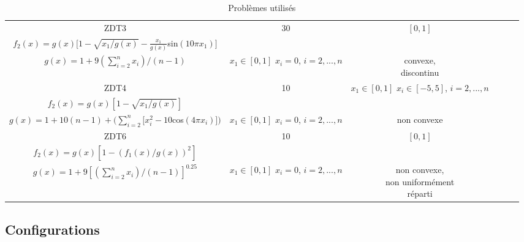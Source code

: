 \documentclass[12pt, letterpaper]{article}
\newcommand{\fncell}[3][]{\makecell[l]{#1 \\ #2 \\ #3}}
\begin{document}
\begin{table}[ht]
\begin{adjustbox}{width=1\textwidth}
\begin{tabular}{|c|c|c|c|c|c|}
      \hline
      ZDT3 & 30 & $[0, 1]$ & \fncell[$f_1(x) = x_1$]
                             {$f_2(x) = g(x) [1 - \sqrt{x_1 / g(x)} - \frac{x_1}{g(x)}$sin$(10\pi{}x_1)]$}
                             {$g(x) = 1 + 9(\sum_{i = 2}^{n} x_i) / (n - 1)$}
                                                                   & \makecell{$x_1 \in{} [0, 1]$ \\ $x_i = 0$, \\ $i = 2, ..., n$} & \makecell{convexe, \\ discontinu}\\
      \hline
      ZDT4 & 10 & \makecell{$x_1 \in{} [0, 1]$ \\ $x_i \in{} [-5, 5]$, \\ $i = 2, ..., n$}
               & \fncell[$f_1(x) = x_1$]
                 {$f_2(x) = g(x) [1 - \sqrt{x_1 / g(x)}]$}
                 {$g(x) = 1 + 10(n - 1) + (\sum_{i = 2}^{n} [x_i^2 - 10$cos$(4\pi{}x_i)])$}
                     & \makecell{$x_1 \in{} [0, 1]$ \\ $x_i = 0$, \\ $i = 2, ..., n$} & non convexe\\
      \hline
      ZDT6 & 10 & $[0, 1]$ & \fncell[$f_1(x) = 1 - \exp(-4x_1)$sin$^6(6\pi{}x_1)$]
                             {$f_2(x) = g(x) [1 - (f_1(x) / g(x))^2]$}
                             {$g(x) = 1 + 9[(\sum_{i = 2}^{n} x_i) / (n - 1)]^{0.25}$}
                                                                   & \makecell{$x_1 \in{} [0, 1]$ \\ $x_i = 0$, \\ $i = 2, ..., n$} & \makecell{non convexe, \\ non uniformément \\ réparti}\\
      \hline
    \end{tabular}
  \end{adjustbox}
  \caption{Problèmes utilisés}
\end{table}

\FloatBarrier

\subsection{Configurations}


\end{document}
